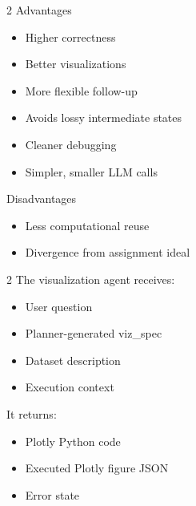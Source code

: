\documentclass[12pt, oneside]{report}
\begin{document}

\begin{multicols}{2}
    Advantages

    \begin{itemize}
        \item Higher correctness
        \item Better visualizations
        \item More flexible follow-up
        \item Avoids lossy intermediate states
        \item Cleaner debugging
        \item Simpler, smaller LLM calls
    \end{itemize}

    \vspace*{\fill}\columnbreak

    Disadvantages

    \begin{itemize}
        \item Less computational reuse
        \item Divergence from assignment ideal
    \end{itemize}

    \vspace*{\fill}
\end{multicols}





\begin{multicols}{2}
    The visualization agent receives:

    \begin{itemize}
        \item User question
        \item Planner-generated viz\_spec
        \item Dataset description
        \item Execution context
    \end{itemize}

    \vspace*{\fill}\columnbreak

    It returns:

    \begin{itemize}
        \item Plotly Python code
        \item Executed Plotly figure JSON
        \item Error state
    \end{itemize}
    \vspace*{\fill}
\end{multicols}
\end{document}
